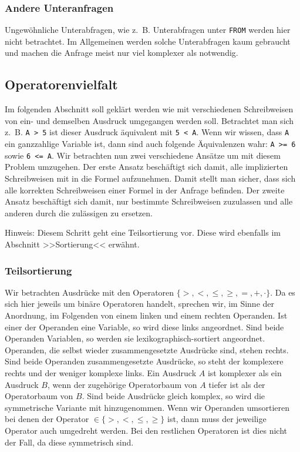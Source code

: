 \subsubsection{Andere Unteranfragen}

Ungewöhnliche Unterabfragen, wie \mbox{z. B.} Unterabfragen unter \verb|FROM| werden hier nicht betrachtet. Im Allgemeinen werden solche Unterabfragen kaum gebraucht und machen die Anfrage meist nur viel komplexer als notwendig.



\subsection{Operatorenvielfalt}

Im folgenden Abschnitt soll geklärt werden wie mit verschiedenen Schreibweisen von ein- und demselben Ausdruck umgegangen werden soll. Betrachtet man sich \mbox{z. B.} \verb|A > 5| ist dieser Ausdruck äquivalent mit \verb|5 < A|. Wenn wir wissen, dass \verb|A| ein ganzzahlige Variable ist, dann sind auch folgende Äquivalenzen wahr: \verb|A >= 6| sowie \verb|6 <= A|. Wir betrachten nun zwei verschiedene Ansätze um mit diesem Problem umzugehen. Der erste Ansatz beschäftigt sich damit, alle implizierten Schreibweisen mit in die Formel aufzunehmen. Damit stellt man sicher, dass sich alle korrekten Schreibweisen einer Formel in der Anfrage befinden. Der zweite Ansatz beschäftigt sich damit, nur bestimmte Schreibweisen zuzulassen und alle anderen durch die zulässigen zu ersetzen.

Hinweis: Diesem Schritt geht eine Teilsortierung vor. Diese wird ebenfalls im Abschnitt >>Sortierung<< erwähnt. 

\subsubsection{Teilsortierung}

Wir betrachten Ausdrücke mit den Operatoren $\{>,<,\leq,\geq,=,+,\cdot\}$. Da es sich hier jeweils um binäre Operatoren handelt, sprechen wir, im Sinne der Anordnung, im Folgenden von einem linken und einem rechten Operanden. Ist einer der Operanden eine Variable, so wird diese links angeordnet. Sind beide Operanden Variablen, so werden sie lexikographisch-sortiert angeordnet. Operanden, die selbst wieder zusammengesetzte Ausdrücke sind, stehen rechts. Sind beide Operanden zusammengesetzte Ausdrücke, so steht der komplexere rechts und der weniger komplexe links. Ein Ausdruck $A$ ist komplexer als ein Ausdruck $B$, wenn der zugehörige Operatorbaum von $A$ tiefer ist als der Operatorbaum von $B$. Sind beide Ausdrücke gleich komplex, so wird die symmetrische Variante mit hinzugenommen. Wenn wir Operanden umsortieren bei denen der Operator $\in \{>,<,\leq,\geq\}$ ist, dann muss der jeweilige Operator auch umgedreht werden. Bei den restlichen Operatoren ist dies nicht der Fall, da diese symmetrisch sind.

